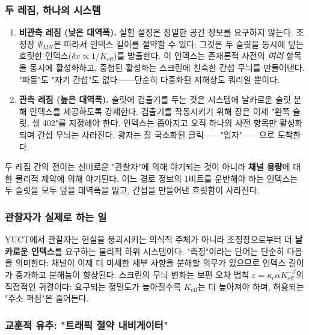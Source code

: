 \documentclass[12pt,a4paper]{article}
\begin{document}
	\subsubsection{두 레짐, 하나의 시스템}
	
	\begin{enumerate}[leftmargin=*]
		\item \textbf{비관측 레짐 (낮은 대역폭).}
		실험 설정은 정밀한 공간 정보를 요구하지 않는다. 조정장 $\Psi_{MN}$은 따라서 인덱스 길이를 절약할 수 있다: 그것은 두 슬릿을 동시에 덮는 흐릿한 인덱스($\delta x \propto 1/K_{\mathrm{eff}}$)를 방출한다. 이 인덱스는 존재론적 사전의 \emph{여러} 항목을 동시에 활성화하고, 중첩된 활성화는 스크린에 친숙한 간섭 무늬를 만들어낸다. "파동"도 "자기 간섭"도 없다——단순히 다중화된 저해상도 쿼리일 뿐이다.
		
		\item \textbf{관측 레짐 (높은 대역폭).}
		슬릿에 검출기를 두는 것은 시스템에 날카로운 슬릿 분해 인덱스를 제공하도록 강제한다. 검출기를 작동시키기 위해 장은 이제 "왼쪽 슬릿, 셀 402"를 지정해야 한다. 인덱스는 좁아지고 오직 하나의 사전 항목만 활성화되며 간섭 무늬는 사라진다. 광자는 잘 국소화된 클릭——"입자"——으로 도착한다.
	\end{enumerate}
	
	두 레짐 간의 전이는 신비로운 "관찰자"에 의해 야기되는 것이 아니라 \textbf{채널 용량}에 대한 물리적 제약에 의해 야기된다. 어느 경로 정보의 1비트를 운반해야 하는 인덱스는 두 슬릿을 모두 덮을 대역폭을 잃고, 간섭을 만들어낸 흐릿함이 사라진다.
	
	\subsubsection{관찰자가 실제로 하는 일}
	
	YUCT에서 관찰자는 현실을 붕괴시키는 의식적 주체가 아니라 조정장으로부터 더 \textbf{날카로운 인덱스}를 요구하는 물리적 하위 시스템이다. "측정"이라는 단어는 단순히 다음을 의미한다: 채널이 이제 더 미세한 세부 사항을 분해할 의무가 있으므로 인덱스 길이가 증가하고 분해능이 향상된다. 스크린의 무늬 변화는 보편 오차 법칙 $\varepsilon = \kappa_c \alpha K_{\mathrm{eff}}^{-\beta}$의 직접적인 귀결이다: 요구되는 정밀도가 높아질수록 $K_{\mathrm{eff}}$는 더 높아져야 하며, 허용되는 "주소 퍼짐"은 줄어든다.
	
	\subsubsection{교훈적 유추: "트래픽 절약 내비게이터"}
	
\end{document}
